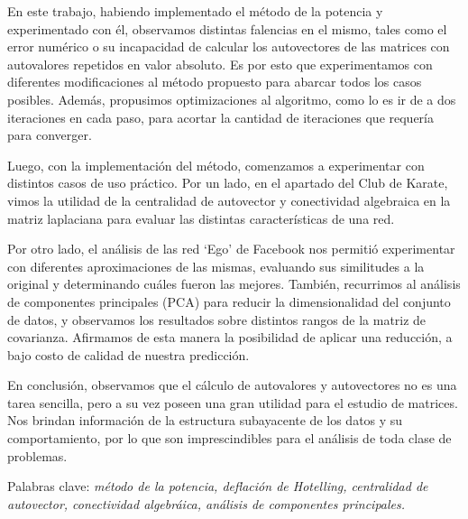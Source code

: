 \vspace{2em}

En este trabajo, habiendo implementado el método de la potencia y experimentado con él, observamos distintas falencias en el mismo, tales como el error numérico o su incapacidad de calcular los autovectores de las matrices con autovalores repetidos en valor absoluto. Es por esto que experimentamos con diferentes modificaciones al método propuesto para abarcar todos los casos posibles. Además, propusimos optimizaciones al algoritmo, como lo es ir de a dos iteraciones en cada paso, para acortar la cantidad de iteraciones que requería para converger. 

Luego, con la implementación del método, comenzamos a experimentar con distintos casos de uso práctico. Por un lado, en el apartado del Club de Karate, vimos la utilidad de la centralidad de autovector y conectividad algebraica en la matriz laplaciana para evaluar las distintas características de una red. 

Por otro lado, el análisis de las red `Ego' de Facebook nos permitió experimentar con diferentes aproximaciones de las mismas, evaluando sus similitudes a la original y determinando cuáles fueron las mejores. También, recurrimos al análisis de componentes principales (PCA) para reducir la dimensionalidad del conjunto de datos, y observamos los resultados sobre distintos rangos de la matriz de covarianza. Afirmamos de esta manera la posibilidad de aplicar una reducción, a bajo costo de calidad de nuestra predicción.

En conclusión, observamos que el cálculo de autovalores y autovectores no es una tarea sencilla, pero a su vez poseen una gran utilidad para el estudio de matrices. Nos brindan información de la estructura subayacente de los datos y su comportamiento, por lo que son imprescindibles para el análisis de toda clase de problemas.

\vspace{1em}
\noindent Palabras clave: \textit{método de la potencia, deflación de Hotelling, centralidad de autovector, conectividad algebráica, análisis de componentes principales.}
